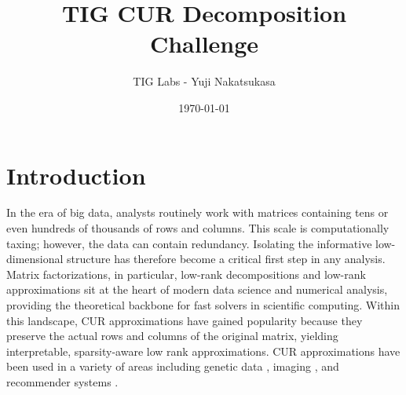 \documentclass[12pt, legalpaper]{article}
\title{TIG CUR Decomposition Challenge}
\author{TIG Labs - Yuji Nakatsukasa}
\date{\monthyeardate\today}
\begin{document}
\maketitle



\section{Introduction}



In the era of big data, analysts routinely work with matrices containing tens or even hundreds of thousands of rows and columns. This scale is computationally taxing; however, the data can contain redundancy. Isolating the informative low-dimensional structure has therefore become a critical first step in any analysis. Matrix factorizations, in particular, low-rank decompositions and low-rank approximations sit at the heart of modern data science and numerical analysis, providing the theoretical backbone for fast solvers in scientific computing. Within this landscape, CUR approximations have gained popularity because they preserve the actual rows and columns of the original matrix, yielding interpretable, sparsity-aware low rank approximations. CUR approximations have been used in a variety of areas including genetic data \cite{bodor2012rcur}, imaging \cite{abdelgawad2024efficient}, and recommender systems \cite{mahoney2006tensor}.
\end{document}
